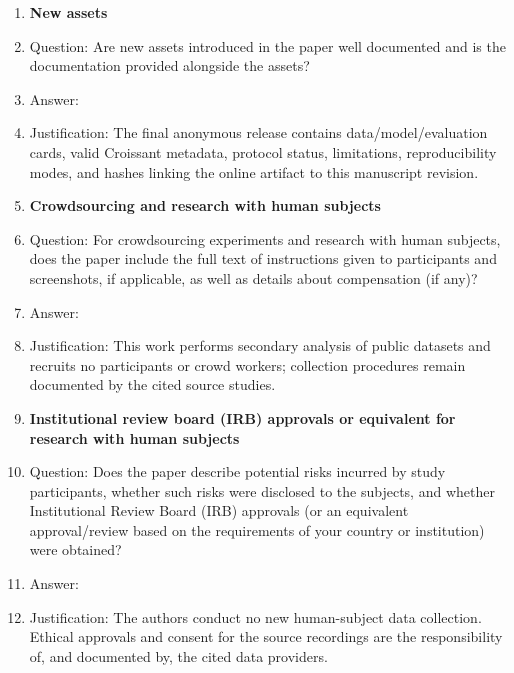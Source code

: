 \begin{enumerate}
\item {\bf New assets}
    \item[] Question: Are new assets introduced in the paper well documented and is the documentation provided alongside the assets?
    \item[] Answer: \answerYes{}
    \item[] Justification: The final anonymous release contains data/model/evaluation cards, valid Croissant metadata, protocol status, limitations, reproducibility modes, and hashes linking the online artifact to this manuscript revision.

\item {\bf Crowdsourcing and research with human subjects}
    \item[] Question: For crowdsourcing experiments and research with human subjects, does the paper include the full text of instructions given to participants and screenshots, if applicable, as well as details about compensation (if any)? 
    \item[] Answer: \answerNA{}
    \item[] Justification: This work performs secondary analysis of public datasets and recruits no participants or crowd workers; collection procedures remain documented by the cited source studies.

\item {\bf Institutional review board (IRB) approvals or equivalent for research with human subjects}
    \item[] Question: Does the paper describe potential risks incurred by study participants, whether such risks were disclosed to the subjects, and whether Institutional Review Board (IRB) approvals (or an equivalent approval/review based on the requirements of your country or institution) were obtained?
    \item[] Answer: \answerNA{}
    \item[] Justification: The authors conduct no new human-subject data collection. Ethical approvals and consent for the source recordings are the responsibility of, and documented by, the cited data providers.


\end{enumerate}
